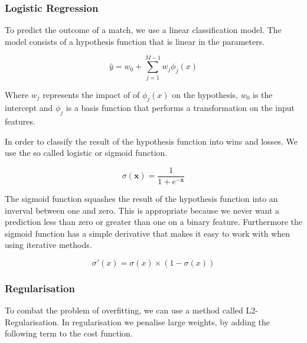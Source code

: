 \subsubsection{Logistic Regression}\label{sec:logistic}
To predict the outcome of a match, we use a linear classification model.
The model consists of a hypothesis function that is linear in the parameters.

\[ \hat{y} = w_0 + \sum_{j=1}^{M-1} w_j \phi_j(x) \]

Where $w_j$ represents the impact of of $\phi_j(x)$ on the hypothesis,
$w_0$ is the intercept and $\phi_j$ is a basis function that
performs a transformation on the input features. 


In order to classify the result of the hypothesis function into wins and losses. 
We use the so called logistic or sigmoid function.

\[ \sigma(\textbf{x}) = \frac{1}{1+e^{- \textbf{x}}} \]

The sigmoid function squashes the result of the hypothesis function into an inverval between one and zero.
This is appropriate because we never want a prediction less than zero or greater than one on a binary feature.
Furthermore the sigmoid function has a simple derivative that makes it easy to work with when using iterative methods.

\[ \sigma'(x) = \sigma(x) \times (1-\sigma(x)) \] 










\subsubsection{Regularisation}
To combat the problem of overfitting, we can use a method called L2-Regularisation.
In regularisation we penalise large weights, by adding the following term to the cost function.

